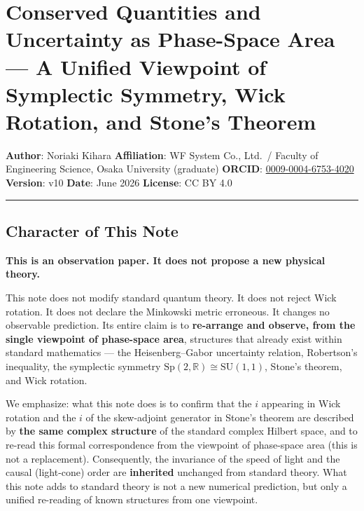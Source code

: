 \documentclass[
]{article}
\author{}
\date{}
\begin{document}
\section{Conserved Quantities and Uncertainty as Phase-Space Area --- A
Unified Viewpoint of Symplectic Symmetry, Wick Rotation, and Stone's
Theorem}\label{conserved-quantities-and-uncertainty-as-phase-space-area-a-unified-viewpoint-of-symplectic-symmetry-wick-rotation-and-stones-theorem}

\textbf{Author}: Noriaki Kihara \textbf{Affiliation}: WF System Co.,
Ltd.~/ Faculty of Engineering Science, Osaka University (graduate)
\textbf{ORCID}:
\href{https://orcid.org/0009-0004-6753-4020}{0009-0004-6753-4020}
\textbf{Version}: v10 \textbf{Date}: June 2026 \textbf{License}: CC BY
4.0

\begin{center}\rule{0.5\linewidth}{0.5pt}\end{center}

\subsection{Character of This Note}\label{character-of-this-note}

\textbf{This is an observation paper. It does not propose a new physical
theory.}

This note does not modify standard quantum theory. It does not reject
Wick rotation. It does not declare the Minkowski metric erroneous. It
changes no observable prediction. Its entire claim is to
\textbf{re-arrange and observe, from the single viewpoint of phase-space
area}, structures that already exist within standard mathematics --- the
Heisenberg--Gabor uncertainty relation, Robertson's inequality, the
symplectic symmetry \(\mathrm{Sp}(2,\mathbb{R})\cong\mathrm{SU}(1,1)\),
Stone's theorem, and Wick rotation.

We emphasize: what this note does is to confirm that the \(i\) appearing
in Wick rotation and the \(i\) of the skew-adjoint generator in Stone's
theorem are described by \textbf{the same complex structure} of the
standard complex Hilbert space, and to re-read this formal
correspondence from the viewpoint of phase-space area (this is not a
replacement). Consequently, the invariance of the speed of light and the
causal (light-cone) order are \textbf{inherited} unchanged from standard
theory. What this note adds to standard theory is not a new numerical
prediction, but only a unified re-reading of known structures from one
viewpoint.
\end{document}
